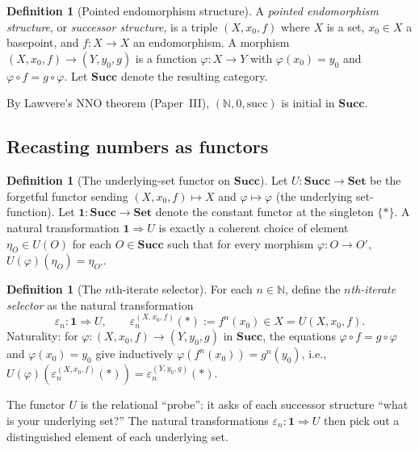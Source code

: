 \documentclass[12pt]{article}
\theoremstyle{definition}
\newtheorem{definition}[theorem]{Definition}
\theoremstyle{remark}
\begin{document}
\begin{definition}[Pointed endomorphism structure]
\label{def:successor-structure}
A \emph{pointed endomorphism structure}, or \emph{successor structure}, is a triple $(X, x_0, f)$ where $X$ is a set, $x_0 \in X$ a basepoint, and $f\colon X \to X$ an endomorphism. A morphism $(X, x_0, f) \to (Y, y_0, g)$ is a function $\varphi\colon X \to Y$ with $\varphi(x_0) = y_0$ and $\varphi \circ f = g \circ \varphi$. Let $\mathbf{Succ}$ denote the resulting category.
\end{definition}

By Lawvere's NNO theorem (Paper~III), $(\mathbb{N}, 0, \mathrm{succ})$ is initial in $\mathbf{Succ}$.

\subsection{Recasting numbers as functors}

\begin{definition}[The underlying-set functor on $\mathbf{Succ}$]
\label{def:U-succ}
Let $U\colon \mathbf{Succ} \to \mathbf{Set}$ be the forgetful functor sending $(X, x_0, f) \mapsto X$ and $\varphi \mapsto \varphi$ (the underlying set-function). Let $\mathbf{1}\colon \mathbf{Succ} \to \mathbf{Set}$ denote the constant functor at the singleton $\{*\}$. A natural transformation $\mathbf{1} \Rightarrow U$ is exactly a coherent choice of element $\eta_{O} \in U(O)$ for each $O \in \mathbf{Succ}$ such that for every morphism $\varphi\colon O \to O'$, $U(\varphi)(\eta_{O}) = \eta_{O'}$.
\end{definition}

\begin{definition}[The $n$th-iterate selector]
\label{def:eps-n}
For each $n \in \mathbb{N}$, define the \emph{$n$th-iterate selector} as the natural transformation
\[
\varepsilon_n\colon \mathbf{1} \Longrightarrow U,\qquad \varepsilon_n^{(X, x_0, f)}(*) := f^n(x_0) \in X = U(X, x_0, f).
\]
Naturality: for $\varphi\colon (X, x_0, f) \to (Y, y_0, g)$ in $\mathbf{Succ}$, the equations $\varphi \circ f = g \circ \varphi$ and $\varphi(x_0) = y_0$ give inductively $\varphi(f^n(x_0)) = g^n(y_0)$, i.e., $U(\varphi)(\varepsilon_n^{(X, x_0, f)}(*)) = \varepsilon_n^{(Y, y_0, g)}(*)$.
\end{definition}

The functor $U$ is the relational ``probe'': it asks of each successor structure ``what is your underlying set?'' The natural transformations $\varepsilon_n\colon \mathbf{1} \Rightarrow U$ then pick out a distinguished element of each underlying set.
\end{document}
